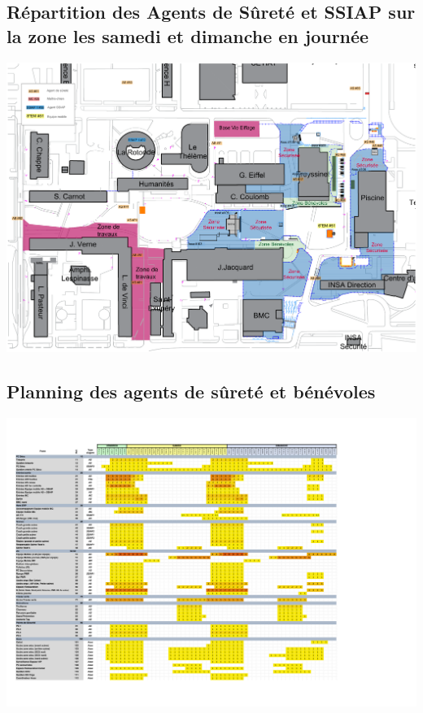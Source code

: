 \documentclass[hidelinks, paper=a4, fontsize=13pt]{report}
\begin{document}
\subsection{Répartition des Agents de Sûreté et SSIAP sur la zone les samedi et dimanche en journée}
\label{refRepartitionAgentsDeSureteJournee}
\begin{center}
	\includegraphics[width=\textwidth,keepaspectratio, angle=90]{Exports/Plan_24h_45eme-AS_Jour}
\end{center}


\subsection{Planning des agents de sûreté et bénévoles}
\label{refPlanningDesAgentsDeSurete}
\begin{center}
	\includegraphics[width=1.2\textwidth,keepaspectratio, angle=90]{Exports/Planning_AS}
\end{center}
\label{planning_as}
\end{document}
